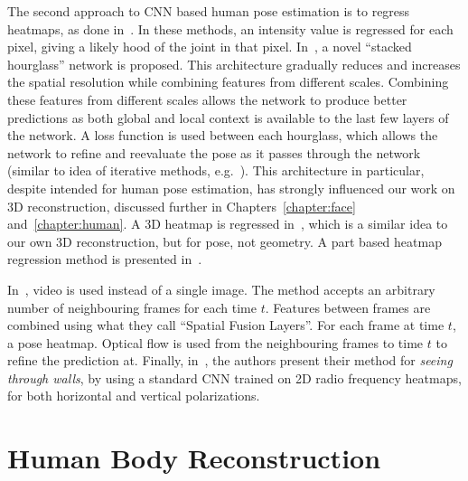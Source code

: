 The second approach to CNN based human pose estimation is to regress
heatmaps, as done
in~\cite{newell2016stacked,pfister2015flowing,zhou2016sparseness,pavlakos2017coarse,mehta2017vnect,zhao2018through}. In
these methods, an intensity value is regressed for each pixel, giving
a likely hood of the joint in that pixel.
In~\cite{newell2016stacked}, a novel ``stacked hourglass'' network is
proposed. This architecture gradually reduces and increases the
spatial resolution while combining features from different
scales. Combining these features from different scales allows the
network to produce better predictions as both global and local context
is available to the last few layers of the network. A loss function is
used between each hourglass, which allows the network to refine and
reevaluate the pose as it passes through the network (similar to idea
of iterative methods,
e.g.~\cite{toshev2014deeppose,carreira2016human}). This architecture
in particular, despite intended for human pose estimation, has
strongly influenced our work on 3D reconstruction, discussed further
in Chapters~\ref{chapter:face} and~\ref{chapter:human}. A 3D heatmap
is regressed in~\cite{pavlakos2017coarse}, which is a similar idea to
our own 3D reconstruction, but for pose, not geometry. A part based
heatmap regression method is presented in~\cite{mehta2017vnect}.

In~\cite{pfister2015flowing}, video is used
instead of a single image. The method accepts an arbitrary number of
neighbouring frames for each time $t$. Features between frames are
combined using what they call ``Spatial Fusion Layers''. For each
frame at time $t$, a pose heatmap. Optical flow is used from the
neighbouring frames to time $t$ to refine the prediction at. Finally,
in~\cite{zhao2018through}, the authors present their method for
\textit{seeing through walls}, by using a standard CNN trained on 2D
radio frequency heatmaps, for both horizontal and vertical
polarizations.



\section{Human Body Reconstruction}


